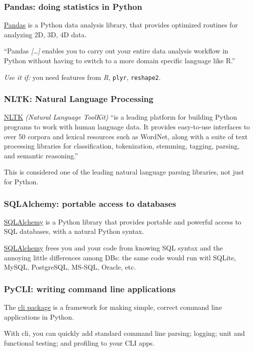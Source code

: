 \documentclass[english,serif,mathserif,xcolor=pdftex,dvipsnames,table]{beamer}
\begin{document}
\begin{frame}
  \frametitle{Pandas: doing statistics in Python}

  \href{http://pandas.pydata.org/}{Pandas} is a Python data analysis
  library, that provides optimized routines for analyzing 2D, 3D, 4D
  data.

  \+ ``Pandas \emph{[\ldots]} enables you to carry out your entire
  data analysis workflow in Python without having to switch to a more
  domain specific language like R.''

  \+ \emph{Use it if:} you need features from \emph{R}, \texttt{plyr},
  \texttt{reshape2}.
\end{frame}


\begin{frame}
  \frametitle{NLTK: Natural Language Processing}

  \href{http://nltk.org/}{NLTK} \emph{(Natural Language ToolKit)} ``is
  a leading platform for building Python programs to work with human
  language data. It provides easy-to-use interfaces to over 50 corpora
  and lexical resources such as WordNet, along with a suite of text
  processing libraries for classification, tokenization, stemming,
  tagging, parsing, and semantic reasoning.''

  \+ This is considered one of the leading natural language parsing
  libraries, not just for Python.
\end{frame}


\begin{frame}
  \frametitle{SQLAlchemy: portable access to databases}

  \href{http://www.sqlalchemy.org/}{SQLAlchemy} is a Python library
  that provides portable and powerful access to SQL databases, with a
  natural Python syntax.

  \+ \href{http://www.sqlalchemy.org/}{SQLAlchemy} frees you and your
  code from knowing SQL syntax and the annoying little differences
  among DBs: the same code would run witl SQLite, MySQL, PostgreSQL,
  MS-SQL, Oracle, etc.
\end{frame}

\begin{frame}
  \frametitle{PyCLI: writing command line applications}

  The \href{https://pypi.python.org/pypi/pyCLI}{cli package} is a
  framework for making simple, correct command line applications in
  Python.

  \+
  With cli, you can quickly add standard command line parsing;
  logging; unit and functional testing; and profiling to your CLI
  apps.
\end{frame}
\end{document}
